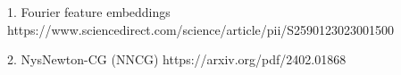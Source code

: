 1. Fourier feature embeddings
https://www.sciencedirect.com/science/article/pii/S2590123023001500

2. NysNewton-CG (NNCG)
https://arxiv.org/pdf/2402.01868

